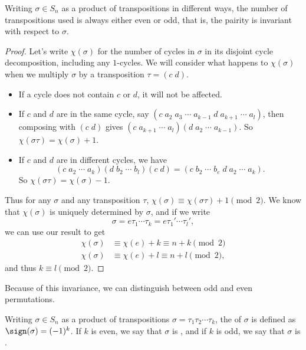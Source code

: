 \documentclass[a4]{scrreprt}
\begin{document}
\begin{theorem}
	Writing $\sigma \in S_n$ as a product of transpositions in different ways, the number of transpositions used is always either even or odd, that is, the pairity is invariant with respect to $\sigma$.
\end{theorem}
\begin{proof}
	Let's write $\chi(\sigma)$ for the number of cycles in $\sigma$ in its disjoint cycle decomposition, including any $1$-cycles. We will consider what happens to $\chi(\sigma)$ when we multiply $\sigma$ by a transposition $\tau = (c \; d)$.
	\begin{itemize}
		\item If a cycle does not contain $c$ or $d$, it will not be affected.
		\item If $c$ and $d$ are in the same cycle, say $(c\; a_2\; a_3\; \cdots \; a_{k - 1} \; d \; a_{k + 1}\; \cdots \; a_l)$, then composing with $(c\; d)$ gives $(c\; a_{k + 1}\; \cdots \; a_l)(d\; a_2\; \cdots\; a_{k - 1})$. So $\chi(\sigma \tau) = \chi(\sigma) + 1$.
		\item If $c$ and $d$ are in different cycles, we have
		$$
		(c\; a_2\; \cdots\; a_k)(d\; b_2\; \cdots\; b_l)(c\; d) = (c \; b_2 \; \cdots\; b_e \; d \; a_2 \; \cdots \; a_k).
		$$
		So $\chi(\sigma \tau) = \chi(\sigma) - 1$.
	\end{itemize}
	Thus for any $\sigma$ and any transposition $\tau$, $\chi(\sigma) \equiv \chi(\sigma \tau) + 1 \pmod{2}$.
	We know that $\chi(\sigma)$ is uniquely determined by $\sigma$, and if we write
	$$
	\sigma = e\tau_1 \cdots \tau_k = e\tau_1 ' \cdots \tau_l ',
	$$
	we can use our result to get
	\begin{align*}
		\chi(\sigma) &\equiv \chi(e) + k \equiv n + k \pmod{2} \\
		\chi(\sigma) &\equiv \chi(e) + l \equiv n + l \pmod{2},
	\end{align*}
	and thus $k \equiv l \pmod{2}$.
\end{proof}

Because of this invariance, we can distinguish between odd and even permutations.
\begin{definition}
	Writing $\sigma \in S_n$ as a product of transpositions $\sigma = \tau_1 \tau_2 \cdots \tau_k$, the  of $\sigma$ is defined as $\sign(\sigma) = (-1)^k$. If $k$ is even, we say that $\sigma$ is , and if $k$ is odd, we say that $\sigma$ is .
\end{definition} 
\end{document}
